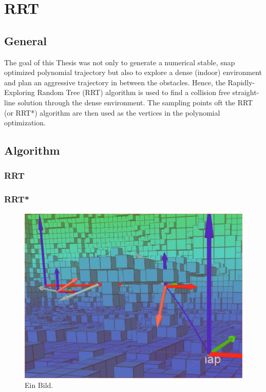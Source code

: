 \chapter{RRT}\label{chap:RRT}

\section{General}

The goal of this Thesis was not only to generate a numerical stable, snap optimized polynomial trajectory but also to explore a dense (indoor) environment and plan an aggressive trajectory in between the obstacles. Hence, the Rapidly-Exploring Random Tree (RRT) algorithm is used to find a collision free straight-line solution through the dense environment. The sampling points oft the RRT (or RRT*) algorithm are then used as the vertices in the polynomial optimization.

\section{Algorithm}

\subsection{RRT}

\subsection{RRT*}



\begin{figure}[h]
   \centering
   \includegraphics[width=1\textwidth]{pics/initialSolution.png}
   \caption{Ein Bild.}
\end{figure}



